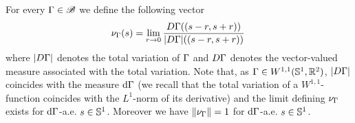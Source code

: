 \begin{defn}\label{curvature-dfn}
For every $\Gamma\in \mathcal{B}$ we define  the following vector
$$\nu_\Gamma(s)= \underset{r\rightarrow 0}{\lim}\, \frac{D \Gamma((s-r,s+r))}{|D \Gamma|((s-r,s+r))} \,$$
where $|D\Gamma|$ denotes the total variation of $\Gamma$ and $D\Gamma$ denotes the vector-valued measure associated with the total variation. Note that, as $\Gamma\in W^{1,1}(\mathbb{S}^1, \mathbb{R}^2)$, $|D\Gamma|$ coincides with the measure $\mathrm{d} \Gamma$ (we recall that the total variation of a $ W^{1,1}$-function coincides with the $L^1$-norm of its derivative) and the limit defining $\nu_\Gamma$ exists  for $\mathrm{d}\Gamma$-a.e. $s\in \mathbb{S}^1$.
Moreover we have $\|\nu_\Gamma\|=1$ for $\mathrm{d}\Gamma$-a.e. $s\in\mathbb{S}^1$. 



 


\end{defn}
